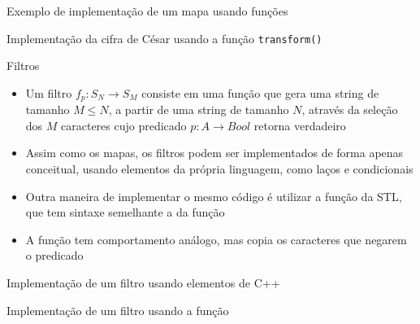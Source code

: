 \begin{frame}[fragile]{Exemplo de implementação de um mapa usando funções}
\end{frame}

\begin{frame}[fragile]{Implementação da cifra de César usando a função \texttt{transform()}}
\end{frame}

\begin{frame}[fragile]{Filtros}

    \begin{itemize}
        \item Um filtro $f_p : S_N \to S_M$ consiste em uma função que gera uma string de tamanho 
            $M \leq N$, a partir de uma string de tamanho $N$, através da seleção dos $M$ 
            caracteres cujo predicado $p: A \to Bool$ retorna verdadeiro
        \pause

        \item Assim como os mapas, os filtros podem ser implementados de forma apenas
            conceitual, usando elementos da própria linguagem, como laços e condicionais
        \pause

        \item Outra maneira de implementar o mesmo código é utilizar a função 
            da STL, que tem sintaxe semelhante a da função 
        \pause

        \item A função  tem comportamento análogo, mas copia os 
            caracteres que negarem o predicado

    \end{itemize}

\end{frame}

\begin{frame}[fragile]{Implementação de um filtro usando elementos de C++}
\end{frame}
\begin{frame}[fragile]{Implementação de um filtro usando a função }
\end{frame}

